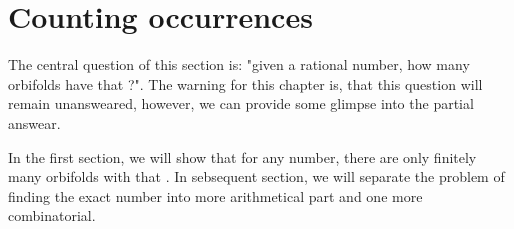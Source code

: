 \chapter{Counting occurrences} \label{counting occurrences}

The central question of this section is: "given a rational number, how many orbifolds 
have that \Eoc ?". The warning for this chapter is, that this question will remain unansweared, 
however, we can provide some glimpse into the partial answear.

In the first section, we will show that for any number, there are only finitely many 
orbifolds with that \Eoc. 
In sebsequent section, we will separate the problem of finding the exact number into 
more arithmetical 
part and one more combinatorial.


